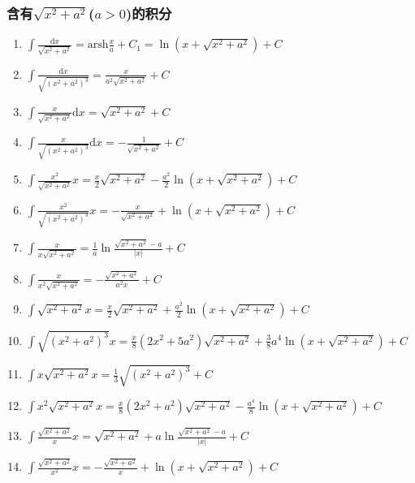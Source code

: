 \documentclass{book}
\begin{document}
\subsubsection{含有$\sqrt{x^2+a^2}$($a>0$)的积分}

\begin{enumerate}

\item $ \int \frac{\mathrm{d}x}{\sqrt{x^2+a^2}} = \mathrm{arsh} \frac{x}{a} + C_1 = \ln(x + \sqrt{x^2+a^2}) + C$

\item $ \int \frac{\mathrm{d}x}{\sqrt{(x^2+a^2)^3}} = \frac{x}{a^2\sqrt{x^2+a^2}} + C $

\item $ \int \frac{x}{\sqrt{x^2+a^2}} \mathrm{d}x = \sqrt{x^2+a^2} + C $

\item $ \int \frac{x}{\sqrt{(x^2+a^2)^3}} \mathrm{d}x = -\frac{1}{\sqrt{x^2+a^2}} + C $

\item $ \int \frac{x^2}{\sqrt{x^2+a^2}}  x = \frac{x}{2}\sqrt{x^2+a^2} - \frac{a^2}{2}\ln(x+\sqrt{x^2+a^2}) + C $

\item $ \int \frac{x^2}{\sqrt{(x^2+a^2)^3}}  x = -\frac{x}{\sqrt{x^2+a^2}} + \ln(x+\sqrt{x^2+a^2}) + C $

\item $ \int \frac{ x}{x\sqrt{x^2+a^2}} = \frac{1}{a} \ln \frac{\sqrt{x^2+a^2}-a}{|x|} + C $

\item $ \int \frac{ x}{x^2\sqrt{x^2+a^2}} = -\frac{\sqrt{x^2+a^2}}{a^2x} + C $

\item $ \int \sqrt{x^2+a^2}  x = \frac{x}{2}\sqrt{x^2+a^2}+\frac{a^2}{2}\ln(x + \sqrt{x^2+a^2}) + C $

\item $ \int \sqrt{(x^2+a^2)^3}  x = \frac{x}{8}(2x^2+5a^2)\sqrt{x^2+a^2} + \frac{3}{8}a^4\ln(x + \sqrt{x^2+a^2}) + C $

\item $ \int x \sqrt{x^2+a^2}  x = \frac{1}{3} \sqrt{(x^2+a^2)^3} + C $

\item $ \int x^2\sqrt{x^2+a^2}  x = \frac{x}{8}(2x^2+a^2)\sqrt{x^2+a^2} - \frac{a^4}{8}\ln(x+\sqrt{x^2+a^2}) + C $

\item $ \int \frac{\sqrt{x^2+a^2}}{x}  x = \sqrt{x^2+a^2} + a \ln \frac{\sqrt{x^2+a^2}-a}{|x|} + C $

\item $ \int \frac{\sqrt{x^2+a^2}}{x^2}  x = -\frac{\sqrt{x^2+a^2}}{x} + \ln(x + \sqrt{x^2+a^2}) + C $

\end{enumerate}
\end{document}
